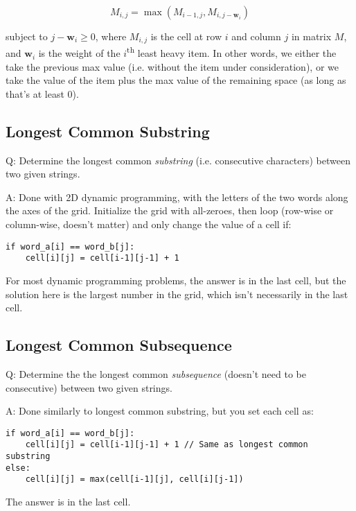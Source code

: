 \documentclass[8pt, table, xcdraw]{article}%
\begin{document}
\begin{equation*}
    M_{i,j} = \max(M_{i-1,j}, M_{i,j-\mathbf{w}_i})
\end{equation*}

subject to $j-\mathbf{w}_i \geq 0$, where $M_{i,j}$ is the cell at row $i$ and column $j$ in matrix $M$, and $\mathbf{w}_i$ is the weight of the $i$\textsuperscript{th} least heavy item. In other words, we either the take the previous max value (i.e. without the item under consideration), or we take the value of the item plus the max value of the remaining space (as long as that's at least $0$).

\subsection{Longest Common Substring}

Q: Determine the longest common \emph{substring} (i.e. consecutive characters) between two given strings.

A: Done with 2D dynamic programming, with the letters of the two words along the axes of the grid. Initialize the grid with all-zeroes, then loop (row-wise or column-wise, doesn't matter) and only change the value of a cell if:

\begin{lstlisting}
if word_a[i] == word_b[j]:
    cell[i][j] = cell[i-1][j-1] + 1
\end{lstlisting}

For most dynamic programming problems, the answer is in the last cell, but the solution here is the largest number in the grid, which isn't necessarily in the last cell.

\subsection{Longest Common Subsequence}

Q: Determine the the longest common \emph{subsequence} (doesn't need to be consecutive) between two given strings.

A: Done similarly to longest common substring, but you set each cell as:

\begin{lstlisting}
if word_a[i] == word_b[j]:
    cell[i][j] = cell[i-1][j-1] + 1 // Same as longest common substring
else:
    cell[i][j] = max(cell[i-1][j], cell[i][j-1])
\end{lstlisting}

The answer is in the last cell.
\end{document}
